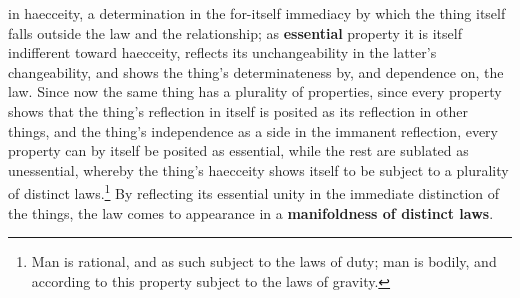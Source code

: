 \documentclass[12pt,a4paper,openany]{book}
\newcommand{\opage}[1]{\marginnote{\footnotesize\textit{[#1]}}}
\begin{document}
in haecceity, a determination in the for-itself
immediacy by which the thing itself falls
outside the law and the relationship; as \textbf{essential} property
it is itself indifferent toward haecceity, reflects
its unchangeability in the latter's changeability,
and shows the thing's determinateness by, and dependence
on, the law. Since now the same thing has a plurality
of properties, since every property shows that
the thing's reflection in itself is posited as its reflection
in other things, and the thing's independence as a
side in the immanent reflection, every
property can by itself be posited as essential, while the
rest are sublated as unessential, whereby the thing's
haecceity shows itself to be subject to a plurality of distinct
laws.\footnote{Man is rational, and as such subject to the laws of duty; man is bodily, and according to this property subject to the laws of gravity.} By reflecting its
essential unity in the immediate distinction of the things,
\setcounter{footnote}{0}%
\opage{187}the law comes to appearance in a \textbf{manifoldness of
distinct laws}.
\end{document}
